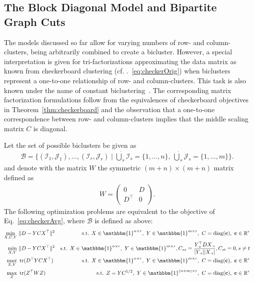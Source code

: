 \subsection{The Block Diagonal Model and Bipartite Graph Cuts}
The models discussed so far allow for varying numbers of row- and column- clusters, being arbitrarily combined to create a bicluster. However, a special interpretation is given for tri-factorizations approximating the data matrix as known from checkerboard clustering (cf. \@Eq.~\eqref{eq:checkerOrig}) when biclusters represent a one-to-one relationship of row- and column-clusters. This task is also known under the name of constant biclustering~\citep{madeira2004biclustering}. The corresponding matrix factorization formulations follow from the equivalences of checkerboard objectives in Theorem~\ref{thm:checkerboard} and the observation that a one-to-one correspondence between row- and column-clusters implies that the middle scaling matrix $C$ is diagonal.
\begin{corollary}\label{thm:blockdiagonal}
Let the set of possible biclusters be given as
\begin{align*}
    \mathcal{B} = \{(\mathcal{I}_1,\mathcal{J}_1),\ldots, (\mathcal{I}_r,\mathcal{J}_r)\mid \dot\bigcup_{s}\mathcal{I}_s=\{1,\ldots,n\},\  \dot\bigcup_{s}\mathcal{J}_s=\{1,\ldots,m\}\}.
\end{align*}
and denote with the matrix $W$ the symmetric $(m+ n)\times (m+n)$ matrix defined as
\begin{align*}
   W=
\begin{pmatrix}
0 & D\\
D^\top & 0
\end{pmatrix}. 
\end{align*}
The following optimization problems are equivalent to the objective of Eq.~\eqref{eq:checkerAvg}, where $\mathcal{B}$ is defined as above:
\begin{align}
    \label{eq:blockDiagC}
    \min_{X,C,Y}&\ \|D-YCX^\top\|^2 &
    \text{s.t. } X\in \mathbbm{1}^{n\times r},\ Y\in\mathbbm{1}^{m\times r},\ C=\diag(\mathbf{c}),\ \mathbf{c}\in\mathbb{R}^{r}\\ 
    \label{eq:blockDiagAvg}
\min_{X,Y}&\ \|D-YCX^\top\|^2&
\text{s.t. } X\in \mathbbm{1}^{n\times r},\ Y\in\mathbbm{1}^{m\times r}, C_{ss}= \frac{Y_{\cdot s}^\top D X_{\cdot s}}{|Y_{\cdot s}||X_{\cdot s}|}, C_{st}=0, s\neq t\\
\label{eq:blockDiagtr}
\max_{X,Y}&\ \tr(D^\top YCX^\top) &
\text{s.t. } X\in \mathbbm{1}^{n\times r},\ Y\in\mathbbm{1}^{m\times r},\ C=\diag(\mathbf{c}),\ \mathbf{c}\in\mathbb{R}^{r}\\
\label{eq:blockDiagW}
\max_{Z}&\ \tr(Z^\top WZ) &
\text{s.t. }  Z=YC^{1/2},\ Y\in \mathbbm{1}^{(n+m)\times r},\ C=\diag(\mathbf{c}),\ \mathbf{c}\in\mathbb{R}^{r}
\end{align}
\end{corollary}
